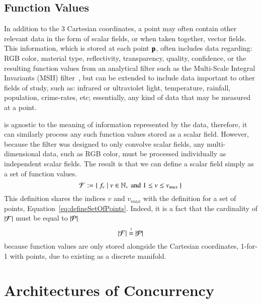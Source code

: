 \subsection{Function Values}
\label{ch2s3ssFV}
In addition to the 3 Cartesian coordinates, a point may often contain other relevant data in the form of scalar fields, or when taken together, vector fields. This information, which is stored at each point $\mathbf{p}$, often includes data regarding: RGB color, material type, reflectivity, transparency, quality, confidence, or the resulting function values from an analytical filter such as the Multi-Scale Integral Invariants (MSII) filter~\cite[p.~21]{Mara12}, but can be extended to include data important to other fields of study, such as: infrared or ultraviolet light, temperature, rainfall, population, crime-rates, etc; essentially, any kind of data that may be measured at a point. 

 is agnostic to the meaning of information represented by the data, therefore, it can similarly process any such function values stored as a scalar field. However, because the filter was designed to only convolve scalar fields, any multi-dimensional data, such as RGB color, must be processed individually as independent scalar fields. The result is that we can define a scalar field simply as a set of function values.
%
\begin{equation}
	\mathcal{F} := \left \{\: f_v \mid v \in \mathbb{N}, \;\text{and}\; 1\leq v \leq v_{max} \:\right \}
	\label{eq:defineSetOfFunctionValues}
\end{equation}%
%
%
%
This definition shares the indices $v$ and $v_{max}$ with the definition for a set of points, Equation~\ref{eq:defineSetOfPoints}. Indeed, it is a fact that the cardinality of $|\mathcal{F}|$ must be equal to $|\mathcal{P}|$
\begin{equation}
	|\mathcal{F}| \overset{!}{=} |\mathcal{P}|
\end{equation}
because function values are only stored alongside the Cartesian coordinates, 1-for-1 with points, due to \tdd{} existing as a discrete manifold.
%
%
%
%
%
\section{Architectures of Concurrency}
%
